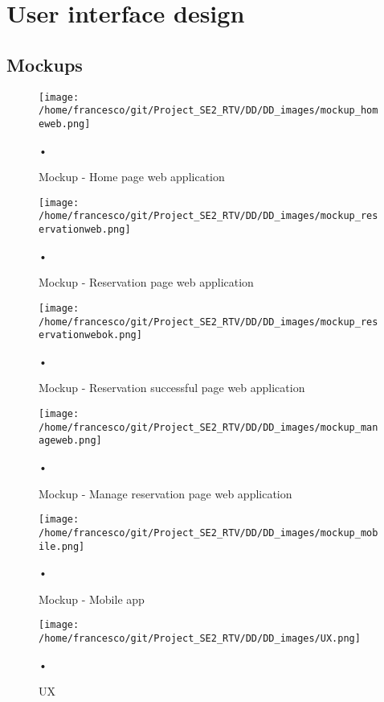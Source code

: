 \documentclass[10pt, a4paper,titlepage]{article}
\begin{document}
\section{User interface design}
\subsection{Mockups}
\begin{figure}[h]
\begin{center}
\texttt{[image: /home/francesco/git/Project\_SE2\_RTV/DD/DD\_images/mockup\_homeweb.png]}
\caption{Mockup - Home page web application}
\label{fig:mockup_homeweb}
\end{center}•
\end{figure}
\begin{figure}[h]
\begin{center}
\texttt{[image: /home/francesco/git/Project\_SE2\_RTV/DD/DD\_images/mockup\_reservationweb.png]}
\caption{Mockup - Reservation page web application}
\label{fig:mockup_reservationweb}
\end{center}•
\end{figure}
\begin{figure}[h]
\begin{center}
\texttt{[image: /home/francesco/git/Project\_SE2\_RTV/DD/DD\_images/mockup\_reservationwebok.png]}
\caption{Mockup - Reservation successful page web application}
\label{fig:mockup_reservationwebok}
\end{center}•
\end{figure}
\begin{figure}[h]
\begin{center}
\texttt{[image: /home/francesco/git/Project\_SE2\_RTV/DD/DD\_images/mockup\_manageweb.png]}
\caption{Mockup - Manage reservation page web application}
\label{fig:mockup_manageweb}
\end{center}•
\end{figure}
\clearpage
\begin{figure}[h]
\begin{center}
\texttt{[image: /home/francesco/git/Project\_SE2\_RTV/DD/DD\_images/mockup\_mobile.png]}
\caption{Mockup - Mobile app}
\label{fig:mockup_mobile}
\end{center}•
\end{figure}
\begin{figure}[h]
\begin{center}
\texttt{[image: /home/francesco/git/Project\_SE2\_RTV/DD/DD\_images/UX.png]}
\caption{UX}
\label{fig:UX}
\end{center}•
\end{figure}
\clearpage
\end{document}
